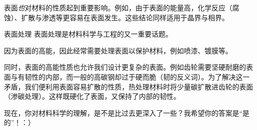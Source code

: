 表面\textsl{也}对材料的性质起到重要影响。例如，由于表面的能量高，化学反应（腐蚀）、扩散与渗透等更容易在表面发生。这些结论同样适用于晶界与相界。

\begin{example}{表面处理}
表面处理是材料科学与工程的又一重要话题。

因为表面的高能，因此经常需要处理表面以保护材料，例如喷漆、镀膜等。

同时，表面的高能性质也允许我们设计更复杂的表面。例如齿轮需要坚硬耐磨的表面与有韧性的内部，而一般的高碳钢却过于硬而脆（韧的反义词）。为了解决这一矛盾，我们便利用表面容易扩散的性质，热处理材料时将少量碳扩散进齿轮的表面（渗碳处理）。这样既硬化了表面，又保持了内部的韧性。
\end{example}

现在，你对材料科学的理解，是不是比过去更深入了一些？我希望你的答案是“是的”！：）
